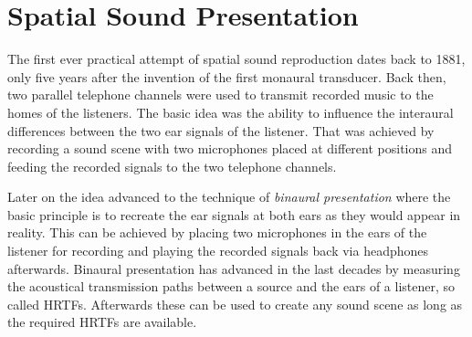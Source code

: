 \section{Spatial Sound Presentation}

The first ever practical attempt of spatial sound reproduction dates back to
1881, only five years after the invention of the first monaural transducer.
Back then, two parallel telephone channels were used to transmit recorded
music to the homes of the listeners.\cite{DuMoncel1881a}
The basic idea was the ability to influence the interaural
differences between the two ear signals of the listener. That was achieved by
recording a sound scene with two microphones placed at different positions 
and feeding the recorded signals to the two telephone channels.

Later on the idea advanced to the technique of \emph{binaural presentation} where the basic
principle is to recreate the ear signals at both ears as they would appear in reality.
This can
be achieved by placing two microphones in the ears of the listener for recording and playing the
recorded signals back via headphones afterwards.
Binaural presentation has advanced in the last decades by measuring the
acoustical transmission paths between a source and the ears of a listener, so called
\acp{HRTF}. Afterwards these can be used to create any sound scene as long as
the required \acp{HRTF} are available.
%

